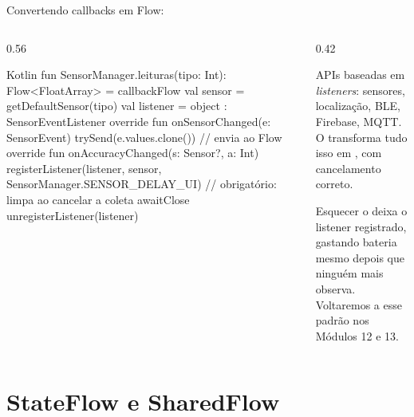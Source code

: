 \documentclass[aspectratio=169,10pt]{beamer}
\begin{document}
\begin{frame}[fragile]{Convertendo callbacks em Flow: }
  \begin{columns}[T]
    \begin{column}{0.56\textwidth}
\begin{codigo}[title=Sensor do aparelho como Flow]{Kotlin}
fun SensorManager.leituras(tipo: Int): Flow<FloatArray> =
  callbackFlow {
    val sensor = getDefaultSensor(tipo)
    val listener = object : SensorEventListener {
      override fun onSensorChanged(e: SensorEvent) {
        trySend(e.values.clone())   // envia ao Flow
      }
      override fun onAccuracyChanged(s: Sensor?, a: Int) {}
    }
    registerListener(listener, sensor,
      SensorManager.SENSOR_DELAY_UI)
    // obrigatório: limpa ao cancelar a coleta
    awaitClose { unregisterListener(listener) }
  }
\end{codigo}
    \end{column}
    \begin{column}{0.42\textwidth}
      \begin{conceito}
        APIs baseadas em \emph{listeners}: sensores, localização, BLE, Firebase, MQTT. O  transforma tudo isso em , com cancelamento correto.
      \end{conceito}
      \begin{atencao}
        Esquecer o  deixa o listener registrado, gastando bateria mesmo depois que ninguém mais observa. Voltaremos a esse padrão nos Módulos 12 e 13.
      \end{atencao}
    \end{column}
  \end{columns}
\end{frame}

\section{StateFlow e SharedFlow}
\end{document}

